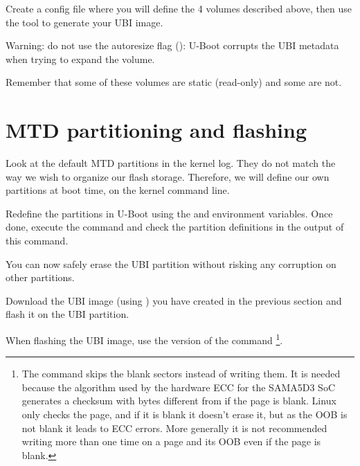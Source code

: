 Create a  config file where you will define the 4 volumes
described above, then use the  tool to generate your
UBI image.

Warning: do not use the autoresize flag ():
U-Boot corrupts the UBI metadata when trying to expand the volume.

Remember that some of these volumes are static (read-only) and some are
not.

%
%

%
%
%
%
%
%

%
%
%

\section{MTD partitioning and flashing}

Look at the default MTD partitions in the kernel log. They do not
match the way we wish to organize our flash
storage. Therefore, we will define our own partitions at boot time,
on the kernel command line.

Redefine the partitions in U-Boot using the  and
 environment variables.
Once done, execute the  command and check the partition
definitions in the output of this command.

You can now safely erase the UBI partition without risking any
corruption on other partitions.

Download the UBI image (using ) you have created in the
previous section and flash it on the UBI partition.

When flashing the UBI image, use the  version of the
command \footnote{The command  skips
  the blank sectors instead of writing them. It is needed because the
  algorithm used by the hardware ECC for the SAMA5D3 SoC generates a
  checksum with bytes different from  if the page is blank. Linux
  only checks the page, and if it is blank it doesn't erase it, but as
  the OOB is not blank it leads to ECC errors. More generally it is
  not recommended writing more than one time on a page and its OOB
  even if the page is blank.}.

